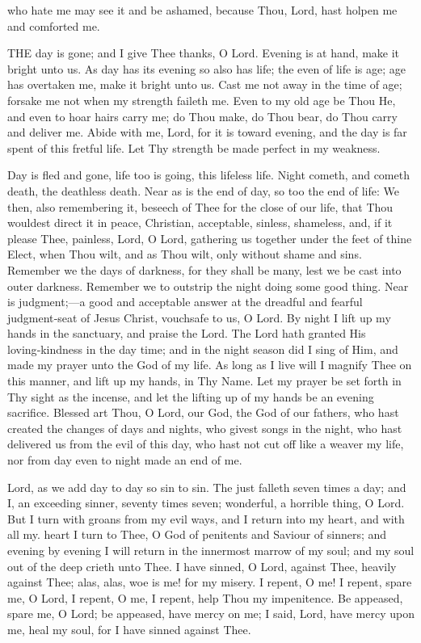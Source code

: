 who hate me may see it and be ashamed, because Thou, Lord, hast holpen me and comforted me.



THE day is gone; and I give Thee thanks, O Lord. Evening is at hand, make it bright unto us. As day has its evening so also has life; the even of life is age; age has overtaken me, make it bright unto us. Cast me not away in the time of age; forsake me not when my strength faileth me. Even to my old age be Thou He, and even to hoar hairs carry me; do Thou make, do Thou bear, do Thou carry and deliver me. Abide with me, Lord, for it is toward evening, and the day is far spent of this fretful life. Let Thy strength be made perfect in my weakness.

Day is fled and gone, life too is going, this lifeless life. Night cometh, and cometh death, the deathless death. Near as is the end of day, so too the end of life: We then, also remembering it, beseech of Thee for the close of our life, that Thou wouldest direct it in peace, Christian, acceptable, sinless, shameless, and, if it please Thee, painless, Lord, O Lord, gathering us together under the feet of thine Elect, when Thou wilt, and as Thou wilt, only without shame and sins. Remember we the days of darkness, for they shall be many, lest we be cast into outer darkness. Remember we to outstrip the night doing some good thing. Near is judgment;—a good and acceptable answer at the dreadful and fearful judgment‑seat of Jesus Christ, vouchsafe to us, O Lord. By night I lift up my hands in the sanctuary, and praise the Lord. The Lord hath granted His loving‑kindness in the day time; and in the night season did I sing of Him,  and made my prayer unto the God of my life. As long as I live will I magnify Thee on this manner, and lift up my hands, in Thy Name. Let my prayer be set forth in Thy sight as the incense, and let the lifting up of my hands be an evening sacrifice. Blessed art Thou, O Lord, our God, the God of our fathers, who hast created the changes of days and nights, who givest songs in the night, who hast delivered us from the evil of this day, who hast not cut off like a weaver my life, nor from day even to night made an end of me.


Lord, as we add day to day so sin to sin. The just falleth seven times a day; and I, an exceeding sinner, seventy times seven; wonderful, a horrible thing, O Lord. But I turn with groans from my evil ways, and I return into my heart, and with all my. heart I turn to Thee, O God of penitents and Saviour of sinners; and evening by evening I will return in the innermost marrow of my soul; and my soul out of the deep crieth unto Thee. I have sinned, O Lord, against Thee, heavily against Thee; alas, alas, woe is me! for my misery. I repent, O me! I repent, spare me, O Lord, I repent, O me, I repent, help Thou my impenitence. Be appeased, spare me, O Lord; be appeased, have mercy on me; I said, Lord, have mercy upon me, heal my soul, for I have sinned against Thee.


